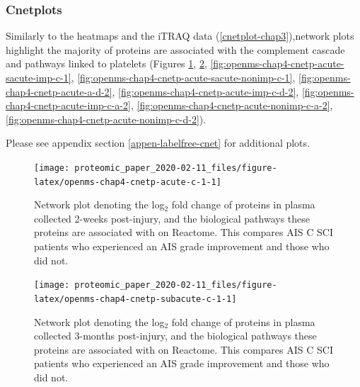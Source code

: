 \documentclass[
]{article}
\begin{document}
\hypertarget{cnetplots}{%
\subsubsection{Cnetplots}\label{cnetplots}}

Similarly to the heatmaps and the iTRAQ data (\ref{cnetplot-chap3}),network plots highlight the majority of proteins are associated with the complement cascade and pathways linked to platelets (Figures \ref{fig:openms-chap4-cnetp-acute-c-1}, \ref{fig:openms-chap4-cnetp-subacute-c-1}, \ref{fig:openms-chap4-cnetp-acute-sacute-imp-c-1}, \ref{fig:openms-chap4-cnetp-acute-sacute-nonimp-c-1}, \ref{fig:openms-chap4-cnetp-acute-a-d-2}, \ref{fig:openms-chap4-cnetp-acute-imp-c-d-2}, \ref{fig:openms-chap4-cnetp-acute-imp-c-a-2}, \ref{fig:openms-chap4-cnetp-acute-nonimp-c-a-2}, \ref{fig:openms-chap4-cnetp-acute-nonimp-c-d-2}).

Please see appendix section \ref{appen-labelfree-cnet} for additional plots.

\begin{SidewaysFigure}



\begin{figure}

{\centering \texttt{[image: proteomic\_paper\_2020-02-11\_files/figure-latex/openms-chap4-cnetp-acute-c-1-1]} 

}

\caption{Network plot denoting the log$_2$ fold change of proteins in plasma collected 2-weeks post-injury, and the biological pathways these proteins are associated with on Reactome. This compares AIS C SCI patients who experienced an AIS grade improvement and those who did not.}\label{fig:openms-chap4-cnetp-acute-c-1}
\end{figure}

\end{SidewaysFigure}
\begin{SidewaysFigure}



\begin{figure}

{\centering \texttt{[image: proteomic\_paper\_2020-02-11\_files/figure-latex/openms-chap4-cnetp-subacute-c-1-1]} 

}

\caption{Network plot denoting the log$_2$ fold change of proteins in plasma collected 3-months post-injury, and the biological pathways these proteins are associated with on Reactome. This compares AIS C SCI patients who experienced an AIS grade improvement and those who did not.}\label{fig:openms-chap4-cnetp-subacute-c-1}
\end{figure}

\end{SidewaysFigure}
\clearpage
\end{document}
